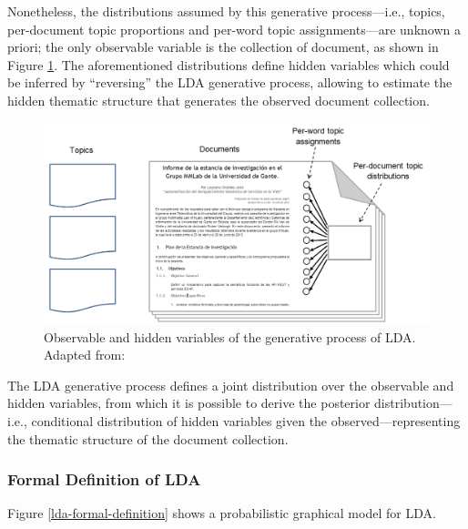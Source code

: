 Nonetheless, the distributions assumed by this generative process---i.e., topics, per-document topic proportions and per-word topic assignments---are unknown a priori; the only observable variable is the collection of document, as shown in Figure \ref{observable-hidden-vbles-lda}. The aforementioned distributions define hidden variables which could be inferred by ``reversing'' the LDA generative process, allowing to estimate the hidden thematic structure that generates the observed document collection. 

\begin{figure}
\includegraphics[scale=0.40]{images/lda-gen-model-eng2}

\caption{Observable and hidden variables of the generative process of LDA.
{\scriptsize Adapted from: \cite{Blei:2012}}}
\label{observable-hidden-vbles-lda}
\end{figure}


The LDA generative process defines a joint distribution over the observable and hidden variables, from which it is possible to derive the posterior
distribution---i.e., conditional distribution of hidden variables given the observed---representing the thematic structure of the document collection.

\subsubsection{Formal Definition of LDA}
\label{subsub:Formal-Def-LDA}

Figure \ref{lda-formal-definition} shows a probabilistic graphical model for LDA.

